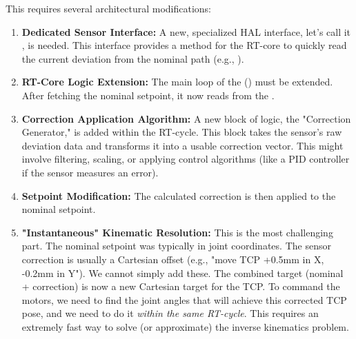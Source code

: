 This requires several architectural modifications:
\begin{enumerate}
    \item \textbf{Dedicated Sensor Interface:} A new, specialized HAL interface, let's call it , is needed. This interface provides a method for the RT-core to quickly read the current deviation from the nominal path (e.g., ).
    \item \textbf{RT-Core Logic Extension:} The main loop of the  () must be extended. After fetching the nominal setpoint, it now reads from the .
    \item \textbf{Correction Application Algorithm:} A new block of logic, the "Correction Generator," is added within the RT-cycle. This block takes the sensor's raw deviation data and transforms it into a usable correction vector. This might involve filtering, scaling, or applying control algorithms (like a PID controller if the sensor measures an error).
    \item \textbf{Setpoint Modification:} The calculated correction is then applied to the nominal setpoint.
    \item \textbf{"Instantaneous" Kinematic Resolution:} This is the most challenging part. The nominal setpoint was typically in joint coordinates. The sensor correction is usually a Cartesian offset (e.g., "move TCP +0.5mm in X, -0.2mm in Y"). We cannot simply add these. The combined target (nominal + correction) is now a new Cartesian target for the TCP. To command the motors, we need to find the joint angles that will achieve this corrected TCP pose, and we need to do it \textit{within the same RT-cycle}. This requires an extremely fast way to solve (or approximate) the inverse kinematics problem.
\end{enumerate}

